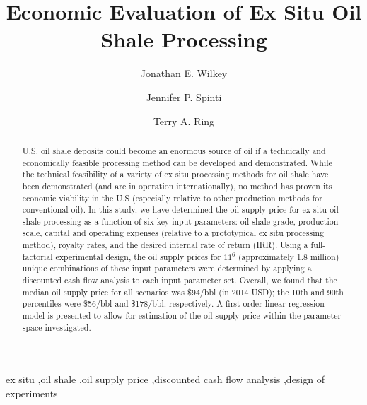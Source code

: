\documentclass[preprint, authoryear]{elsarticle}
\begin{document}


\begin{frontmatter}

\title{Economic Evaluation of Ex  Situ Oil Shale Processing}

\author[icse]{Jonathan E. Wilkey}

\author[icse]{Jennifer P. Spinti}

\author[icse]{Terry A. Ring}


\address[icse]{Institute for Clean and Secure Energy, 155 South 1452 East, Room 350, Salt Lake City, UT 84112, United States}

\begin{abstract}

U.S. oil shale deposits could become an enormous source of oil if a technically and economically feasible processing method can be developed and demonstrated. While the technical feasibility of a variety of ex situ processing methods for oil shale have been demonstrated (and are in operation internationally), no method has proven its economic viability in the U.S (especially relative to other production methods for conventional oil). In this study, we have determined the oil supply price for ex situ oil shale processing as a function of six key input parameters: oil shale grade, production scale, capital and operating expenses (relative to a prototypical ex situ processing method), royalty rates, and the desired internal rate of return (IRR). Using a full-factorial experimental design, the oil supply prices for $11^6$ (approximately 1.8 million) unique combinations of these input parameters were determined by applying a discounted cash flow analysis to each input parameter set. Overall, we found that the median oil supply price for all scenarios was \$94/bbl (in 2014 USD); the 10th and 90th percentiles were \$56/bbl and \$178/bbl, respectively. A first-order linear regression model is presented to allow for estimation of the oil supply price within the parameter space investigated.

\end{abstract}

\begin{keyword}

ex situ \sep oil shale \sep oil supply price \sep discounted cash flow analysis \sep design of experiments

\end{keyword}

\end{frontmatter}
\end{document}
